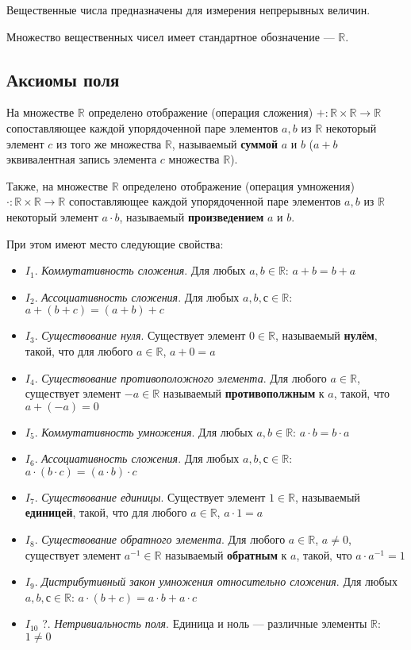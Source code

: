 Вещественные числа предназначены для измерения непрерывных величин.

Множество вещественных чисел имеет стандартное обозначение — $\mathbb{R}$.

\subsection{Аксиомы поля}

На множестве $\mathbb{R}$ определено отображение (операция сложения) $+:\mathbb {R} \times \mathbb {R} \to \mathbb {R}$ сопоставляющее каждой упорядоченной паре элементов $a,b$ из $\mathbb{R}$ некоторый элемент $c$ из того же множества $\mathbb{R}$, называемый \textbf{суммой} $a$ и $b$ ($a+b$ эквивалентная запись элемента $c$ множества $\mathbb{R}$).

Также, на множестве $\mathbb{R}$ определено отображение (операция умножения) $\cdot :\mathbb {R} \times \mathbb {R} \to \mathbb {R}$ сопоставляющее каждой упорядоченной паре элементов $a, b$ из $\mathbb{R}$  некоторый элемент $a\cdot b$, называемый \textbf{произведением} $a$ и $b$.

При этом имеют место следующие свойства:
\begin{itemize}
    \setlength\itemsep{-0.2em}
    \item $I_1$. \textit{Коммутативность сложения}. Для любых $a, b \in \mathbb{R}$: $a + b = b + a$
    \item $I_2$. \textit{Ассоциативность сложения}. Для любых $a, b, с \in \mathbb{R}$: $a + (b + c) = (a + b) + c$
    \item $I_3$. \textit{Существование нуля}. Существует элемент $0\in \mathbb {R}$, называемый \textbf{нулём}, такой, что для любого $a \in \mathbb {R}$, $a + 0 = a$
    \item $I_4$. \textit{Существование противоположного элемента}. Для любого  $a \in \mathbb {R}$, существует элемент $-a \in \mathbb{R}$ называемый \textbf{противополжным} к $a$, такой, что $a + (-a) = 0$
    \item $I_5$. \textit{Коммутативность умножения}. Для любых $a, b \in \mathbb{R}$: $a \cdot b = b \cdot a$
    \item $I_6$. \textit{Ассоциативность сложения}. Для любых $a, b, с \in \mathbb{R}$: $a \cdot (b \cdot c) = (a \cdot b) \cdot c$
    \item $I_7$. \textit{Существование единицы}. Существует элемент $1\in \mathbb {R}$, называемый \textbf{единицей}, такой, что для любого $a \in \mathbb {R}$, $a \cdot 1 = a$
    \item $I_8$. \textit{Существование обратного элемента}. Для любого  $a \in \mathbb {R}$, $a \not= 0$, существует элемент $a^{-1} \in \mathbb{R}$ называемый \textbf{обратным} к $a$, такой, что $a \cdot a^{-1} = 1$
    \item $I_9$. \textit{Дистрибутивный закон умножения относительно сложения}. Для любых $a, b, с \in \mathbb{R}$: $a \cdot (b + c) = a \cdot b + a \cdot c$
    \item $I_{10}$ ?. \textit{Нетривиальность поля}. Единица и ноль — различные элементы $\mathbb{R}$: $1 \not= 0$
\end{itemize}

